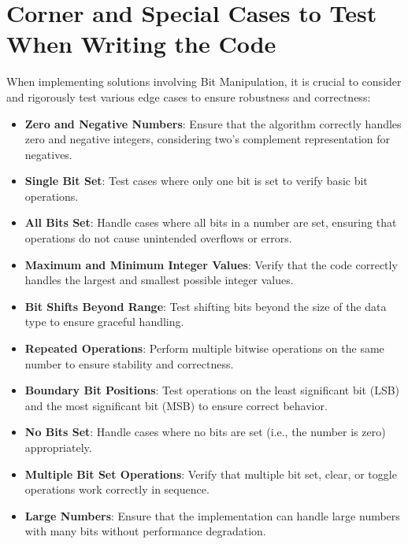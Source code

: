 \section*{Corner and Special Cases to Test When Writing the Code}

When implementing solutions involving Bit Manipulation, it is crucial to consider and rigorously test various edge cases to ensure robustness and correctness:

\begin{itemize}
    \item \textbf{Zero and Negative Numbers}: Ensure that the algorithm correctly handles zero and negative integers, considering two's complement representation for negatives.
    
    \item \textbf{Single Bit Set}: Test cases where only one bit is set to verify basic bit operations.
    
    \item \textbf{All Bits Set}: Handle cases where all bits in a number are set, ensuring that operations do not cause unintended overflows or errors.
    
    \item \textbf{Maximum and Minimum Integer Values}: Verify that the code correctly handles the largest and smallest possible integer values.
    
    \item \textbf{Bit Shifts Beyond Range}: Test shifting bits beyond the size of the data type to ensure graceful handling.
    
    \item \textbf{Repeated Operations}: Perform multiple bitwise operations on the same number to ensure stability and correctness.
    
    \item \textbf{Boundary Bit Positions}: Test operations on the least significant bit (LSB) and the most significant bit (MSB) to ensure correct behavior.
    
    \item \textbf{No Bits Set}: Handle cases where no bits are set (i.e., the number is zero) appropriately.
    
    \item \textbf{Multiple Bit Set Operations}: Verify that multiple bit set, clear, or toggle operations work correctly in sequence.
    
    \item \textbf{Large Numbers}: Ensure that the implementation can handle large numbers with many bits without performance degradation.
\end{itemize}


